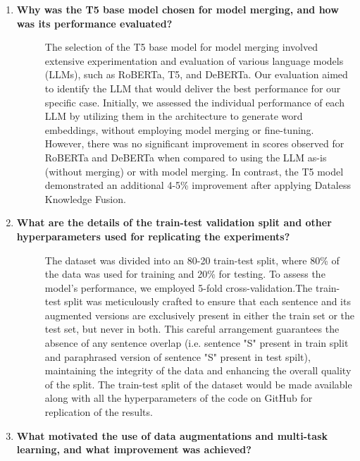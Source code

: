 \begin{enumerate}
    \item[\ding{93}] { \selectfont \textbf{Why was the T5 base model chosen for model merging, and how was its performance evaluated?}}

    \vspace{-3mm}
    \begin{description}
    \item[] The selection of the T5 base model for model merging involved extensive experimentation and evaluation of various language models (LLMs), such as RoBERTa, T5, and DeBERTa. Our evaluation aimed to identify the LLM that would deliver the best performance for our specific case. Initially, we assessed the individual performance of each LLM by utilizing them in the architecture to generate word embeddings, without employing model merging or fine-tuning. However, there was no significant improvement in scores observed for RoBERTa and DeBERTa when compared to using the LLM as-is (without merging) or with model merging. In contrast, the T5 model demonstrated an additional 4-5\% improvement after applying Dataless Knowledge Fusion.
    \end{description}

    \item[\ding{93}] { \selectfont \textbf{What are the details of the train-test validation split and other hyperparameters used for replicating the experiments?}} 

    \vspace{-3mm}
    \begin{description}
    \item[] The dataset was divided into an 80-20 train-test split, where 80\% of the data was used for training and 20\% for testing. To assess the model's performance, we employed 5-fold cross-validation.The train-test split was meticulously crafted to ensure that each sentence and its augmented versions are exclusively present in either the train set or the test set, but never in both. This careful arrangement guarantees the absence of any sentence overlap (i.e. sentence "S" present in train split and paraphrased version of sentence "S" present in test spilt), maintaining the integrity of the data and enhancing the overall quality of the split. The train-test split of the dataset would be made available along with all the hyperparameters of the code on GitHub for replication of the results.
    \end{description}


    \item[\ding{93}] { \selectfont \textbf{What motivated the use of data augmentations and multi-task learning, and what improvement was achieved?}} 


\end{enumerate}
